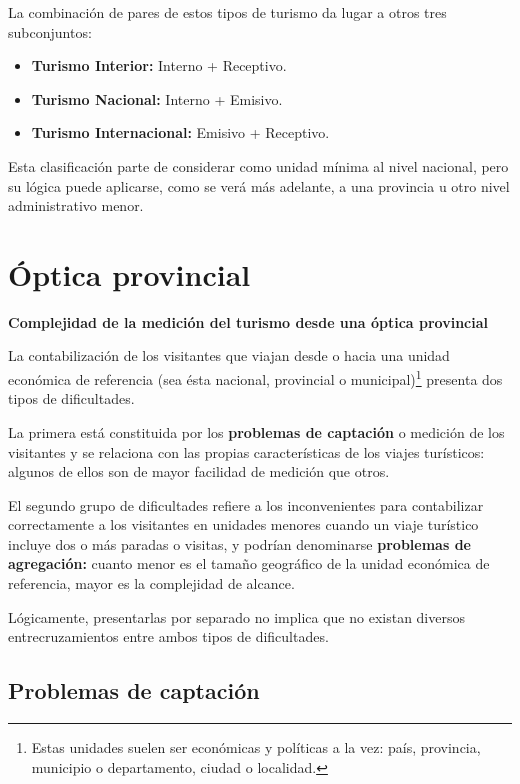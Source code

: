 \documentclass[
  openany]{book}
\begin{document}
La combinación de pares de estos tipos de turismo da lugar a otros tres subconjuntos:

\begin{itemize}
\item
  \textbf{Turismo Interior:} Interno + Receptivo.
\item
  \textbf{Turismo Nacional:} Interno + Emisivo.
\item
  \textbf{Turismo Internacional:} Emisivo + Receptivo.
\end{itemize}

Esta clasificación parte de considerar como unidad mínima al nivel nacional, pero su lógica puede aplicarse, como se verá más adelante, a una provincia u otro nivel administrativo menor.

\hypertarget{uxf3ptica-provincial}{%
\section{Óptica provincial}\label{uxf3ptica-provincial}}

\textbf{Complejidad de la medición del turismo desde una óptica provincial}

La contabilización de los visitantes que viajan desde o hacia una unidad económica de referencia (sea ésta nacional, provincial o municipal)\footnote{Estas unidades suelen ser económicas y políticas a la vez: país, provincia, municipio o departamento, ciudad o localidad.} presenta dos tipos de dificultades.

La primera está constituida por los \textbf{problemas de captación} o medición de los visitantes y se relaciona con las propias características de los viajes turísticos: algunos de ellos son de mayor facilidad de medición que otros.

El segundo grupo de dificultades refiere a los inconvenientes para contabilizar correctamente a los visitantes en unidades menores cuando un viaje turístico incluye dos o más paradas o visitas, y podrían denominarse \textbf{problemas de agregación:} cuanto menor es el tamaño geográfico de la unidad económica de referencia, mayor es la complejidad de alcance.

Lógicamente, presentarlas por separado no implica que no existan diversos entrecruzamientos entre ambos tipos de dificultades.

\hypertarget{problemas-de-captaciuxf3n}{%
\subsection{Problemas de captación}\label{problemas-de-captaciuxf3n}}
\end{document}
